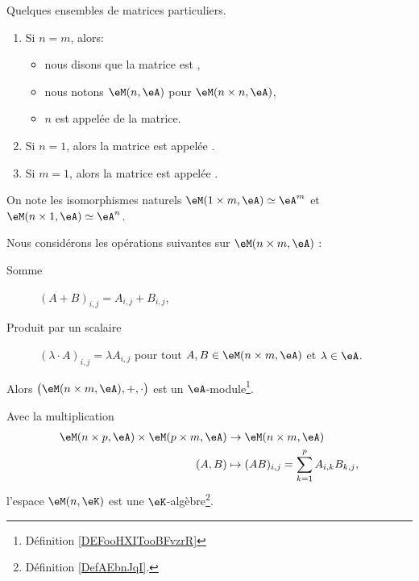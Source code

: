 \begin{definition}
	Quelques ensembles de matrices particuliers.
	\begin{enumerate}
		\item Si \( n=m\), alors:
		      \begin{itemize}
			      \item nous disons que la matrice est ,
			      \item nous notons \( \eM(n,\eA)\) pour \( \eM(n\times n,\eA)\),
			      \item \( n \) est appelée  de la matrice.
		      \end{itemize}
		\item Si \( n = 1 \), alors la matrice est appelée .
		\item Si \( m = 1 \), alors la matrice est appelée .
	\end{enumerate}
\end{definition}

\begin{normaltext}
	On note les isomorphismes naturels \( \eM(1\times m,\eA) \simeq \eA^m\) et \( \eM(n\times 1,\eA) \simeq \eA^n\).
\end{normaltext}

\begin{lemmaDef}        \label{LEMooYWTEooQyLxKv}
	Nous considérons les opérations suivantes sur \( \eM(n\times m, \eA)\) :
	\begin{description}
		\item[Somme] \( (A+B)_{i,j}=A_{i,j}+B_{i,j}\),
		\item[Produit par un scalaire] \( (\lambda \cdot A)_{i,j}=\lambda A_{i,j}\) pour tout \( A,B\in \eM(n\times m,\eA ) \) et \( \lambda\in \eA \).
	\end{description}
	Alors \( \big( \eM(n\times m, \eA), +,\cdot \big)\) est un \( \eA\)-module\footnote{Définition \ref{DEFooHXITooBFvzrR}}.
\end{lemmaDef}

\begin{lemmaDef}        \label{LEMooMBZTooKdGvON}
	Avec la multiplication
	\begin{equation}
		\begin{aligned}
			\eM(n\times p,\eA)\times \eM(p\times m,\eA) & \to \eM(n\times m,\eA)                         \\
			(A,B)                                       & \mapsto (AB)_{i,j}=\sum_{k=1}^pA_{i,k}B_{k,j},
		\end{aligned}
	\end{equation}
	l'espace \( \eM(n,\eK)\) est une \( \eK\)-algèbre\footnote{Définition \ref{DefAEbnJqI}.}.
\end{lemmaDef}

